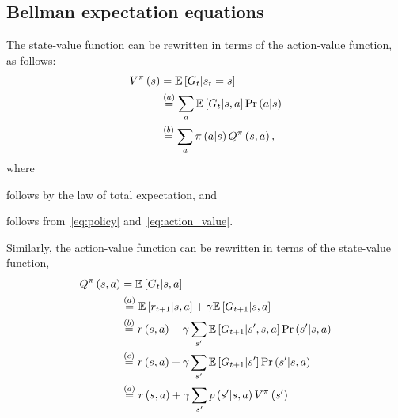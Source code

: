 \subsection{Bellman expectation equations}
The state-value function can be rewritten in terms of the action-value function, as follows:
\begin{align} \label{eq:v_wrt_q}
    \statevalue\policyscript\left(\state\right)
    	&=\mathbb{E}\left[\return_{\timestep}\middle\vert\randomstate_{\timestep}=\state\right] \notag \\
    	&\overset{(a)}{=}\sum_{\action}\mathbb{E}\left[\return_{\timestep}\middle\vert\state,\action\right]\Pr\left(\action\middle\vert\state\right) \notag \\
    	&\overset{(b)}{=}\sum_{\action}\policy\left(\action\middle\vert\state\right)\actionvalue\policyscript\left(\state,\action\right),
\end{align}
where
\begin{enumerate*}[label=(\alph*)]
	\item follows by the law of total expectation, and
	\item follows from~\eqref{eq:policy} and~\eqref{eq:action_value}.
\end{enumerate*}
Similarly, the action-value function can be rewritten in terms of the state-value function,
\begin{align} \label{eq:q_wrt_v}
    \actionvalue\policyscript\left(\state,\action\right)
    	&=\mathbb{E}\left[\return_{\timestep}\middle\vert\state,\action\right] \notag \\
    	&\overset{(a)}{=}\mathbb{E}\left[\randomreward_{\timestep+1}\middle\vert\state,\action\right]+\discount\mathbb{E}\left[\return_{\timestep+1}\middle\vert\state,\action\right] \notag \\
    	&\overset{(b)}{=}\immediatereward\left(\state,\action\right)+\discount\sum_{\state'}\mathbb{E}\left[\return_{\timestep+1}\middle\vert\state',\state,\action\right]\Pr\left(\state'\middle\vert\state,\action\right) \notag \\
    	&\overset{(c)}{=}\immediatereward\left(\state,\action\right)+\discount\sum_{\state'}\mathbb{E}\left[\return_{t+1}\middle\vert\state'\right]\Pr\left(\state'\middle\vert\state,\action\right) \notag \\
    	&\overset{(d)}{=}\immediatereward\left(\state,\action\right)+\discount\sum_{\state'}\transition\left(\state'\middle\vert\state,\action\right)\statevalue\policyscript\left(\state'\right)
\end{align}
